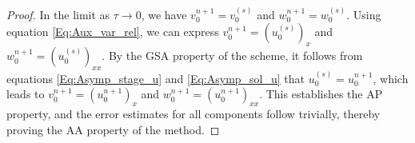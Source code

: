 \documentclass[10pt,a4paper]{amsart}
\begin{document}
\begin{proof}
In the limit as $\tau \to 0$, we have $v_0^{n+1} = v_0^{(s)}$ and $w_0^{n+1} = w_0^{(s)}$. Using equation
\eqref{Eq:Aux_var_rel}, we can express $v_0^{n+1} = (u_0^{(s)})_x$ and $w_0^{n+1} = (u_0^{(s)})_{xx}$.
By the GSA property of the scheme, it follows from equations \eqref{Eq:Asymp_stage_u} and \eqref{Eq:Asymp_sol_u}
that $u_0^{(s)} = u_0^{n+1}$, which leads to $v_0^{n+1} = (u_0^{n+1})_x$ and $w_0^{n+1} = (u_0^{n+1})_{xx}$.
This establishes the AP property, and the error estimates for all components follow trivially, thereby proving
the AA property of the method.
\end{proof}
\end{document}
